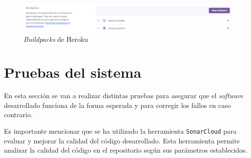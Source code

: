 \begin{figure}
	\centering
	\includegraphics[width=\textwidth]{../img/Anexos/ManualProgramador/Heroku.png}
	\caption{\textit{Buildpacks} de Heroku}\label{fig:Heroku}
\end{figure}


\section{Pruebas del sistema}
En esta sección se van a realizar distintas pruebas para asegurar que el \textit{software} desarrollado funciona de la forma esperada y para corregir los fallos en caso contrario.

Es importante mencionar que se ha utilizado la herramienta \texttt{SonarCloud} para evaluar y mejorar la calidad del código desarrollado. Esta herramienta permite analizar la calidad del código en el repositorio según sus parámetros establecidos.


